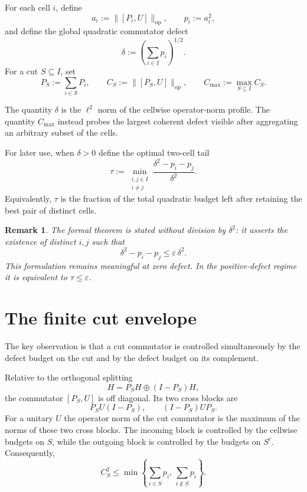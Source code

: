 \documentclass[11pt]{article}
\newtheorem{remark}[theorem]{Remark}
\newcommand{\op}{\mathrm{op}}
\newcommand{\cmax}{C_{\max}}
\newcommand{\dd}{\delta}
\newcommand{\tauq}{\tau}
\begin{document}
For each cell $i$, define
\begin{equation}\label{eq:ai}
  a_i:=\|[P_i,U]\|_{\op},
  \qquad
  p_i:=a_i^2,
\end{equation}
and define the global quadratic commutator defect
\begin{equation}\label{eq:delta}
  \dd:=\left(\sum_{i\in I}p_i\right)^{1/2}.
\end{equation}
For a cut $S\subseteq I$, set
\begin{equation}\label{eq:cut}
  P_S:=\sum_{i\in S}P_i,
  \qquad
  C_S:=\|[P_S,U]\|_{\op},
  \qquad
  \cmax:=\max_{S\subseteq I}C_S.
\end{equation}

The quantity $\dd$ is the $\ell^2$ norm of the cellwise operator-norm profile.
The quantity $\cmax$ instead probes the largest coherent defect visible after
aggregating an arbitrary subset of the cells.

For later use, when $\dd>0$ define the optimal two-cell tail
\begin{equation}\label{eq:tau}
  \tauq:=
  \min_{\substack{i,j\in I\\i\neq j}}
  \frac{\dd^2-p_i-p_j}{\dd^2}.
\end{equation}
Equivalently, $\tauq$ is the fraction of the total quadratic budget left after
retaining the best pair of distinct cells.

\begin{remark}
The formal theorem is stated without division by $\dd^2$: it asserts the
existence of distinct $i,j$ such that
\[
  \dd^2-p_i-p_j\le \varepsilon\,\dd^2.
\]
This formulation remains meaningful at zero defect.  In the positive-defect
regime it is equivalent to $\tauq\le\varepsilon$.
\end{remark}

\section{The finite cut envelope}

The key observation is that a cut commutator is controlled simultaneously by
the defect budget on the cut and by the defect budget on its complement.

Relative to the orthogonal splitting
\[
  H=P_SH\oplus (I-P_S)H,
\]
the commutator $[P_S,U]$ is off diagonal.  Its two cross blocks are
\[
  P_SU(I-P_S),
  \qquad
  (I-P_S)UP_S.
\]
For a unitary $U$ the operator norm of the cut commutator is the maximum of
the norms of these two cross blocks.  The incoming block is controlled by the
cellwise budgets on $S$, while the outgoing block is controlled by the
budgets on $S^c$.  Consequently,
\begin{equation}\label{eq:cut-min}
  C_S^2
  \le
  \min\left\{
    \sum_{i\in S}p_i,\,
    \sum_{i\notin S}p_i
  \right\}.
\end{equation}
\end{document}
